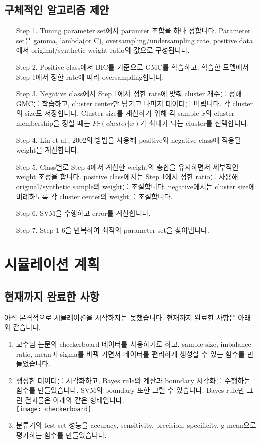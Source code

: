\documentclass[a4papaer, 11pt]{article}
\begin{document}
 \subsection{구체적인 알고리즘 제안}
 \begin{enumerate}
 	\item [Step 1.] Tuning parameter set에서 paramter 조합을 하나 정합니다. Parameter set은 gamma, lambda(or C), oversampling/undersampling rate, positive data에서 original/synthetic weight ratio의 값으로 구성됩니다.
 	\item [Step 2.] Positive class에서 BIC를 기준으로 GMC를 학습하고, 학습한 모델에서 Step 1에서 정한 rate에 따라 oversampling합니다.
 	\item [Step 3.] Negative class에서 Step 1에서 정한 rate에 맞춰 cluster 개수를 정해 GMC를 학습하고, cluster center만 남기고 나머지 데이터를 버립니다. 각 cluster의 size도 저장합니다. Cluster size를 계산하기 위해 각 sample $x$의 cluster membership을 정할 때는 $Pr(cluster|x)$가 최대가 되는 cluster를 선택합니다.
 	\item [Step 4.] Lin et al., 2002의 방법을 사용해 positive와 negative class에 적용될 weight을 계산합니다.
 	\item [Step 5.] Class별로 Step 4에서 계산한 weight의 총합을 유지하면서 세부적인 weight 조정을 합니다. positive class에서는 Step 1에서 정한 ratio를 사용해 original/synthetic sample의 weight를 조절합니다. negative에서는 cluster size에 비례하도록 각 cluster center의 weight를 조절합니다.
 	\item [Step 6.] SVM을 수행하고 error를 계산합니다.
 	\item [Step 7.] Step 1-6을 반복하여 최적의 parameter set을 찾아냅니다.
 	\end{enumerate}

\section{시뮬레이션 계획}
\subsection{현재까지 완료한 사항}
아직 본격적으로 시뮬레이션을 시작하지는 못했습니다. 현재까지 완료한 사항은 아래와 같습니다.
\begin{enumerate}
	\item 교수님 논문의 checkerboard 데이터를 사용하기로 하고, sample size, imbalance ratio, mean과 sigma를 바꿔 가면서 데이터를 편리하게 생성할 수 있는 함수를 만들었습니다.\\
	
	\item 생성한 데이터를 시각화하고, Bayes rule의 계산과 boundary 시각화를 수행하는 함수를 만들었습니다. SVM의 boundary 또한 그릴 수 있습니다. Bayes rule만 그린 결과물은 아래와 같은 형태입니다.\\
	\texttt{[image: checkerboard]}
	
	\item 분류기의 test set 성능을 accuracy, sensitivity, precision, specificity, g-mean으로 평가하는 함수를 만들었습니다.
\end{enumerate}
\end{document}

